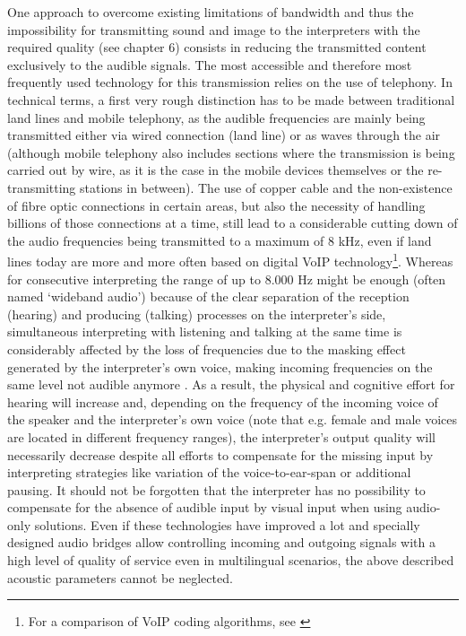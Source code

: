 \documentclass[output=paper]{langsci/langscibook}
\begin{document}
One approach to overcome existing limitations of bandwidth and thus the impossibility for transmitting sound and image to the interpreters with the required quality (see chapter 6) consists in reducing the transmitted content exclusively to the audible signals. The most accessible and therefore most frequently used technology for this transmission relies on the use of telephony. In technical terms, a first very rough distinction has to be made between traditional land lines and mobile telephony, as the audible frequencies are mainly being transmitted either via wired connection (land line) or as waves through the air (although mobile telephony also includes sections where the transmission is being carried out by wire, as it is the case in the mobile devices themselves or the re-transmitting stations in between). The use of copper cable and the non-existence of fibre optic connections in certain areas, but also the necessity of handling billions of those connections at a time, still lead to a considerable cutting down of the audio frequencies being transmitted to a maximum of 8 kHz, even if land lines today are more and more often based on digital VoIP technology\footnote{For a comparison of VoIP coding algorithms, see \citet{Singh2016}}. Whereas for consecutive interpreting the range of up to 8.000 Hz might be enough (often named ‘wideband audio’) because of the clear separation of the reception (hearing) and producing (talking) processes on the interpreter’s side, simultaneous interpreting with listening and talking at the same time is considerably affected by the loss of frequencies due to the masking effect generated by the interpreter’s own voice, making incoming frequencies on the same level not audible anymore \citep{Jumpelt1984}. As a result, the physical and cognitive effort for hearing will increase and, depending on the frequency of the incoming voice of the speaker and the interpreter’s own voice (note that e.g. female and male voices are located in different frequency ranges), the interpreter’s output quality will necessarily decrease despite all efforts to compensate for the missing input by interpreting strategies like variation of the voice-to-ear-span or additional pausing. It should not be forgotten that the interpreter has no possibility to compensate for the absence of audible input by visual input when using audio-only solutions. Even if these technologies have improved a lot and specially designed audio bridges allow controlling incoming and outgoing signals with a high level of quality of service even in multilingual scenarios, the above described acoustic parameters cannot be neglected.
\end{document}
